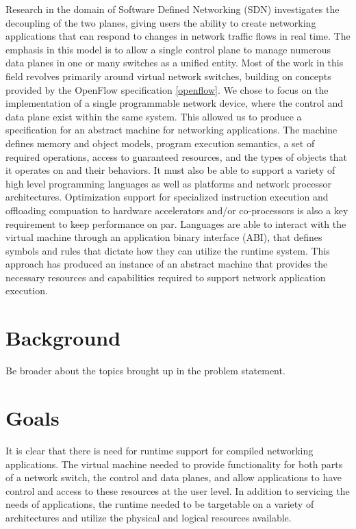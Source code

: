 Research in the domain of Software Defined Networking (SDN) investigates the
decoupling of the two planes, giving users the ability to create networking
applications that can respond to changes in network traffic flows in real time.
The emphasis in this model is to allow a single control plane to manage numerous
data planes in one or many switches as a unified entity. Most of the work in
this field revolves primarily around virtual network switches, building on
concepts provided by the OpenFlow specification \ref{openflow}. We chose to
focus on the implementation of a single programmable network device, where the
control and data plane exist within the same system. This allowed us to produce
a specification for an abstract machine for networking applications.
The machine defines memory and object models, program execution semantics,
a set of required operations, access to guaranteed resources, and the types
of objects that it operates on and their behaviors. It must also be able to
support a variety of high level programming languages as well as platforms
and network processor architectures. Optimization support for specialized
instruction execution and offloading compuation to hardware accelerators and/or
co-processors is also a key requirement to keep performance on par. Languages
are able to interact with the virtual machine through an application binary
interface (ABI), that defines symbols and rules that dictate how they can
utilize the runtime system. This approach has produced an instance of an
abstract machine that provides the necessary resources and capabilities
required to support network application execution.


\section{Background}
Be broader about the topics brought up in the problem statement.

\section{Goals}
It is clear that there is need for runtime support for compiled
networking applications. The virtual machine needed to provide functionality
for both parts of a network switch, the control and data planes, and allow
applications to have control and access to these resources at the user level.
In addition to servicing the needs of applications, the runtime needed to be
targetable on a variety of architectures and utilize the physical and logical
resources available.

